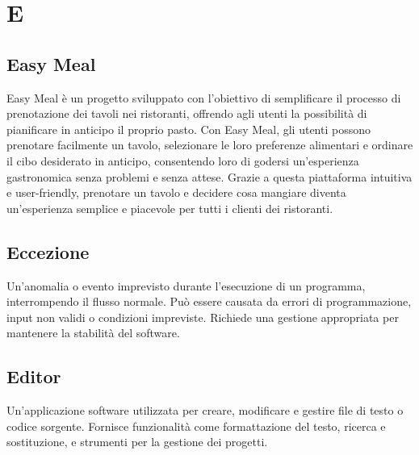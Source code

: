 \section{E} 
\subsection{Easy Meal} 
Easy Meal è un progetto sviluppato con l'obiettivo di semplificare il processo di prenotazione dei tavoli nei ristoranti, offrendo agli utenti la possibilità di pianificare in anticipo il proprio pasto. Con Easy Meal, gli utenti possono prenotare facilmente un tavolo, selezionare le loro preferenze alimentari e ordinare il cibo desiderato in anticipo, consentendo loro di godersi un'esperienza gastronomica senza problemi e senza attese. Grazie a questa piattaforma intuitiva e user-friendly, prenotare un tavolo e decidere cosa mangiare diventa un'esperienza semplice e piacevole per tutti i clienti dei ristoranti.
\subsection{Eccezione} 
Un'anomalia o evento imprevisto durante l'esecuzione di un programma, interrompendo il flusso normale. Può essere causata da errori di programmazione, input non validi o condizioni impreviste. Richiede una gestione appropriata per mantenere la stabilità del software.
\subsection{Editor} 
Un'applicazione software utilizzata per creare, modificare e gestire file di testo o codice sorgente. Fornisce funzionalità come formattazione del testo, ricerca e sostituzione, e strumenti per la gestione dei progetti.
